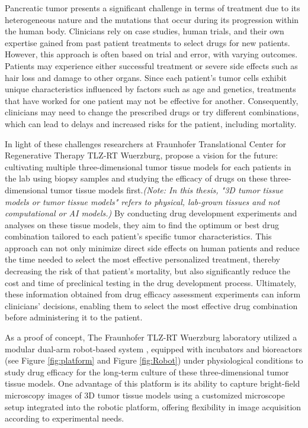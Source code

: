 \documentclass[12pt,twoside,a4paper,parskip]{scrbook} %
\begin{document}
Pancreatic tumor presents a significant challenge in terms of treatment due to its heterogeneous nature and the mutations that occur during its progression within the human body. Clinicians rely on case studies, human trials, and their own expertise gained from past patient treatments to select drugs for new patients. However, this approach is often based on trial and error, with varying outcomes. Patients may experience either successful treatment or severe side effects such as hair loss and damage to other organs. Since each patient's tumor cells exhibit unique characteristics influenced by factors such as age and genetics, treatments that have worked for one patient may not be effective for another. Consequently, clinicians may need to change the prescribed drugs or try different combinations, which can lead to delays and increased risks for the patient, including mortality.

In light of these challenges researchers at Fraunhofer Translational Center for Regenerative Therapy TLZ-RT Wuerzburg,  propose a vision for the future: cultivating multiple three-dimensional tumor tissue models for each patients in the lab using biopsy samples and studying the efficacy of drugs on these three-dimensional tumor tissue models first.\textit{(Note: In this thesis, "3D tumor tissue models or tumor tissue models" refers to physical, lab-grown tissues and not computational or AI models.)} By conducting drug development experiments and analyses on these tissue models, they aim to find the optimum or best drug combination tailored to each patient's specific tumor characteristics. This approach can not only minimize direct side effects on human patients and reduce the time needed to select the most effective personalized treatment, thereby decreasing the risk of that patient's mortality, but also significantly reduce the cost and time of preclinical testing in the drug development process. Ultimately, these information obtained from drug efficacy assessment experiments can inform clinicians' decisions, enabling them to select the most effective drug combination before administering it to the patient.

As a proof of concept, The Fraunhofer TLZ-RT Wuerzburg laboratory utilized a modular dual-arm robot-based system \cite{Dembski2023Establishing}, equipped with incubators and bioreactors (see Figure \ref{fig:platform} and Figure \ref{fig:Robot}) under physiological conditions to study drug efficacy for the long-term culture of these three-dimensional tumor tissue models. One advantage of this platform is its ability to capture bright-field microscopy images of 3D tumor tissue models using a customized microscope setup integrated into the robotic platform, offering flexibility in image acquisition according to experimental needs.
\end{document}
